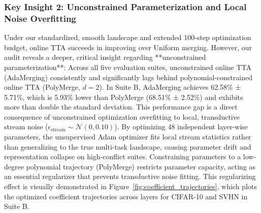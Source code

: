 \subsubsection{Key Insight 2: Unconstrained Parameterization and Local Noise Overfitting}
Under our standardized, smooth landscape and extended 100-step optimization budget, online TTA succeeds in improving over Uniform merging.
However, our audit reveals a deeper, critical insight regarding **unconstrained parameterization**:
Across all five evaluation suites, unconstrained online TTA (AdaMerging) consistently and significantly lags behind polynomial-constrained online TTA (PolyMerge, $d=2$).
In Suite B, AdaMerging achieves 62.58\% ± 5.71\%, which is 5.93\% lower than PolyMerge (68.51\% ± 2.52\%) and exhibits more than double the standard deviation.
This performance gap is a direct consequence of unconstrained optimization overfitting to local, transductive stream noise ($\epsilon_{\text{stream}} \sim \mathcal{N}(0, 0.10)$).
By optimizing 48 independent layer-wise parameters, the unsupervised Adam optimizer fits local stream statistics rather than generalizing to the true multi-task landscape, causing parameter drift and representation collapse on high-conflict suites.
Constraining parameters to a low-degree polynomial trajectory (PolyMerge) restricts parameter capacity, acting as an essential regularizer that prevents transductive noise fitting.
This regularizing effect is visually demonstrated in Figure~\ref{fig:coefficient_trajectories}, which plots the optimized coefficient trajectories across layers for CIFAR-10 and SVHN in Suite B.
